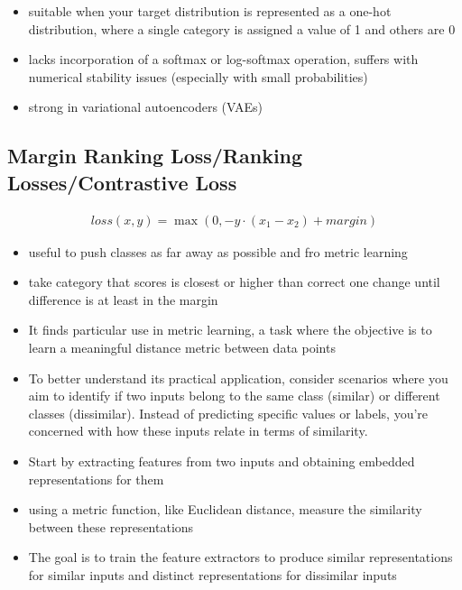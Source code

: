 \documentclass[11pt]{article}
\begin{document}
\begin{itemize}
    \item suitable when your target distribution is represented as a one-hot distribution, where a single category is assigned a value of 1 and others are 0
    \item lacks incorporation of a softmax or log-softmax operation, suffers with numerical stability issues (especially with small probabilities)
    \item strong in variational autoencoders (VAEs)
\end{itemize}

\subsection{Margin Ranking Loss/Ranking Losses/Contrastive Loss}

\begin{definition}\label{eq:Marign-Ranking-Loss}
    \begin{align*}
        loss(x,y)=\max(0,-y \cdot (x_1 - x_2) + margin)
    \end{align*}
\end{definition}

\begin{itemize}
    \item useful to push classes as far away as possible and fro metric learning
    \item take category that scores is closest or higher than correct one change until difference is at least in the margin
    \item It finds particular use in metric learning, a task where the objective is to learn a meaningful distance metric between data points
    \item To better understand its practical application, consider scenarios where you aim to identify if two inputs belong to the same class (similar) or different classes (dissimilar). Instead of predicting specific values or labels, you're concerned with how these inputs relate in terms of similarity.
    \item Start by extracting features from two inputs and obtaining embedded representations for them
    \item using a metric function, like Euclidean distance, measure the similarity between these representations 
    \item The goal is to train the feature extractors to produce similar representations for similar inputs and distinct    representations for dissimilar inputs
\end{itemize}
\end{document}
